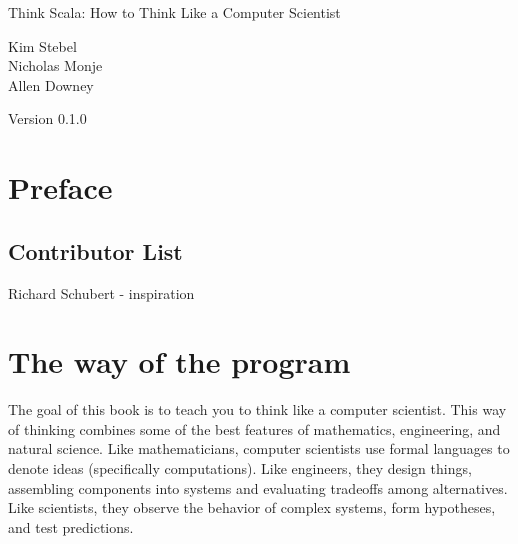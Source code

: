 \documentclass[10pt]{book}
\newcommand{\thetitle}{Think Scala: How to Think Like a Computer Scientist}
\newcommand{\theversion}{0.1.0}
\begin{document}

\begin{htmlonly}


{\Large \thetitle}

{\large Kim Stebel\\}
{\large Nicholas Monje\\}
{\large Allen Downey\\}

Version \theversion

\setcounter{chapter}{-1}

\end{htmlonly}

\chapter{Preface}


\section*{Contributor List}
{\large Richard Schubert - inspiration}


\begin{latexonly}

\tableofcontents

\clearemptydoublepage

\end{latexonly}

\mainmatter


\chapter{The way of the program}

The goal of this book is to teach you to think like a
computer scientist.  This way of thinking combines some of the best features
of mathematics, engineering, and natural science.  Like mathematicians,
computer scientists use formal languages to denote ideas (specifically
computations).  Like engineers, they design things, assembling components
into systems and evaluating tradeoffs among alternatives.  Like scientists,
they observe the behavior of complex systems, form hypotheses, and test
predictions.

\end{document}
